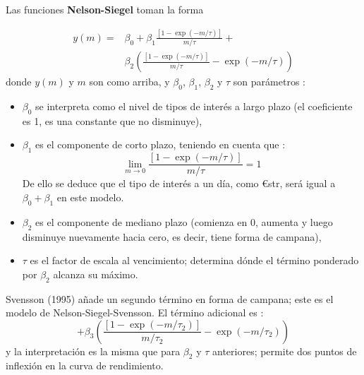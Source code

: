 \begin{f}


Las funciones \textbf{Nelson-Siegel} toman la forma

{\small\begin{align*}
y( m ) =& \beta _0 + \beta _1\frac{{\left[ {1 - \exp \left( { - m/\tau} \right)} \right]}}{m/\tau} + \\
		&\beta _2 {\left(\frac{{\left[ {1 - \exp \left( { - m/\tau} \right)} \right]}}{m/\tau} - \exp \left( { - m/\tau}\right)\right)}
\label{MTNSeq}
\end{align*}}
%
donde \(y\left( m \right)\) y \(m\) son como arriba, y \(\beta_0\), \(\beta_1\), \(\beta_2\) y \(\tau\) son parámetros :


\begin{itemize}

\item   \(\beta_0\) se interpreta como el nivel de tipos de interés a largo plazo (el coeficiente es 1, es una constante que no disminuye),

\item   \(\beta_1\) es el componente de corto plazo, teniendo en cuenta que :
\begin{equation*}
	\lim_{m \rightarrow 0} \frac{{\left[ {1 - \exp \left( { - m/\tau} \right)} \right]}}{m/\tau}=1
\end{equation*}
De ello se deduce que el tipo de interés a un día, como €str, será igual a \(\beta_0 + \beta_1\) en este modelo.
\item   \(\beta_2\) es el componente de mediano plazo (comienza en 0, aumenta y luego disminuye nuevamente hacia cero, es decir, tiene forma de campana),
\item \(\tau\) es el factor de escala al vencimiento; determina dónde el término ponderado por \(\beta_2\) alcanza su máximo.
\end{itemize}

Svensson (1995) añade un segundo término en forma de campana; este es el modelo de Nelson-Siegel-Svensson. El término adicional es :
%
\begin{equation*}
+\beta _3 {\left(\frac{{\left[ {1 - \exp \left( { - m/\tau_2} \right)} \right]}}{m/\tau_2} - \exp \left( { - m/\tau_2}\right)\right)}
\label{MTSveq}
\end{equation*}
y la interpretación es la misma que para \(\beta_2\) y \(\tau\) anteriores; permite dos puntos de inflexión en la curva de rendimiento.


\end{f}
